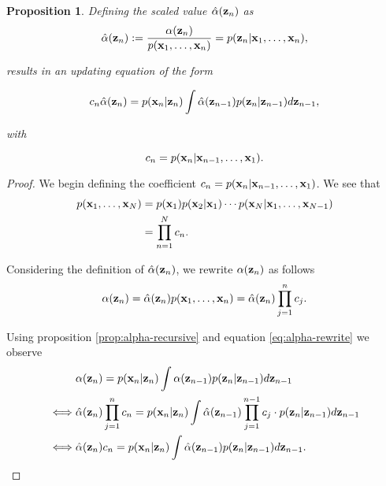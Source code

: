 \documentclass[11pt]{article}
\numberwithin{equation}{section}
\newcommand{\x}{{\bf x}}
\newcommand{\z}{{\bf z}}
\newtheorem{proposition}{Proposition}[section]
\begin{document}
\begin{proposition} \label{prop:alpha-hat}
	Defining the scaled value $\hat\alpha(\z_n)$ as
	\begin{equation}
		\hat\alpha(\z_n) := \frac{\alpha(\z_n)}{p(\x_1, \ldots, \x_n)} = p(\z_n \vert \x_1, \ldots, \x_n),
	\end{equation}
	
	results in an updating equation of the form
	
	\begin{equation}
		 c_n \hat\alpha(\z_n) = p(\x_n\vert\z_n)\int \hat\alpha(\z_{n-1})p(\z_n \vert \z_{n-1}) d\z_{n-1},
	\end{equation}
	
	with
	
	\begin{equation}
		c_n = p(\x_n \vert \x_{n-1}, \ldots, \x_1).
	\end{equation}
\end{proposition}

\begin{proof}
	We begin defining the coefficient $c_n = p(\x_n \vert \x_{n-1}, \ldots, \x_1)$. We see that
	\begin{align}
		p(\x_1, \ldots, \x_N) &=  p(\x_1) p(\x_2 \vert \x_1) \cdots p(\x_N \vert \x_1, \ldots, \x_{N-1})\\
		&= \prod_{n=1}^N c_n.
	\end{align}
	
	Considering the definition of $\hat\alpha(\z_n)$, we rewrite $\alpha(\z_n)$ as follows
	\begin{equation} \label{eq:alpha-rewrite}
		\alpha(\z_n) = \hat\alpha(\z_n) p(\x_1, \ldots, \x_n) = \hat\alpha(\z_n) \prod_{j=1}^n c_j.
	\end{equation}
	
	Using proposition \ref{prop:alpha-recursive} and equation \eqref{eq:alpha-rewrite} we observe
	\begin{align}
		&\alpha(\z_n) = p(\x_n\vert \z_n) \int  \alpha(\z_{n-1})p(\z_n\vert\z_{n-1}) d\z_{n-1}\\
		\iff & \hat\alpha(\z_n) \prod_{j=1}^{n} c_n = p(\x_n \vert \z_n) \int  \hat\alpha(\z_{n-1}) \prod_{j=1}^{n-1} c_j \cdot  p(\z_n\vert\z_{n-1}) d\z_{n-1}\\
		\iff & \hat\alpha(\z_n) c_n =   p(\x_n \vert \z_n) \int  \hat\alpha(\z_{n-1})   p(\z_n\vert\z_{n-1}) d\z_{n-1}.
	\end{align}
	
	
\end{proof}
\end{document}
